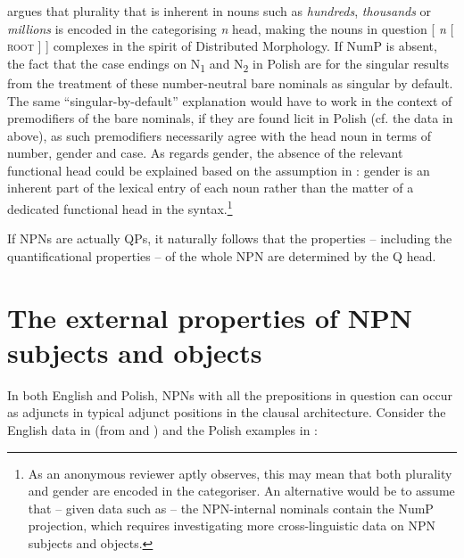 \documentclass[output=paper]{langscibook}
\begin{document}
\noindent \citet{Acquaviva2008} argues that plurality that is inherent in nouns such as \textit{hundreds}, \textit{thousands} or \textit{millions} is encoded in the categorising \textit{n} head, making the nouns in question [ \textit{n} [ \textsc{root} ] ] complexes in the spirit of Distributed Morphology. If NumP is absent, the fact that the case endings on N\textsubscript{1} and N\textsubscript{2} in Polish are for the singular results from the treatment of these number-neutral bare nominals as singular by default. The same ``singular-by-default'' explanation would have to work in the context of premodifiers of the bare nominals, if they are found licit in Polish (cf. the data in  above), as such premodifiers necessarily agree with the head noun in terms of number, gender and case. As regards gender, the absence of the relevant functional head could be explained based on the assumption in \citet{Alexiadou.etal2007}: gender is an inherent part of the lexical entry of each noun rather than the matter of a dedicated functional head in the syntax.\footnote{As an anonymous reviewer aptly observes, this may mean that both plurality and gender are encoded in the categoriser. An alternative would be to assume that – given data such as  – the NPN-internal nominals contain the NumP projection, which requires investigating more cross-linguistic data on NPN subjects and objects.}

If NPNs are actually QPs, it naturally follows that the properties – including the quantificational properties – of the whole NPN are determined by the Q head.

\section{The external properties of NPN subjects and objects}\label{psk:sec:sec3}\largerpage

In both English and Polish, NPNs with all the prepositions in question can occur as adjuncts in typical adjunct positions in the clausal architecture. Consider the English data in  (from \citealt{Jackendoff2008} and \citealt{Huddleston.Pullum2002}) and the Polish examples in :
\end{document}
